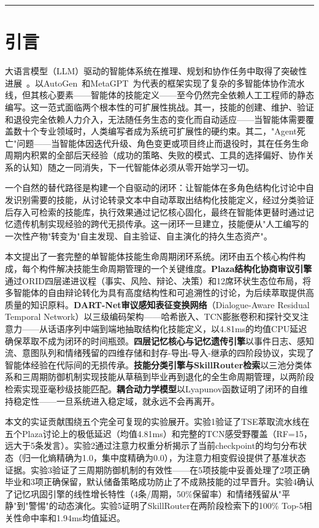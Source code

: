 \documentclass[12pt,a4paper]{ctexart}
\begin{document}
\vspace{12pt}
\hrule
\vspace{12pt}

\section{引言}

大语言模型（LLM）驱动的智能体系统在推理、规划和协作任务中取得了突破性进展~\cite{wu2023autogen,park2023generative,hong2023metagpt,shinn2023reflexion,yao2022react}。以AutoGen~\cite{wu2023autogen}和MetaGPT~\cite{hong2023metagpt}为代表的框架实现了复杂的多智能体协作流水线，但其核心要素——智能体的技能定义——至今仍然完全依赖人工工程师的静态编写。这一范式面临两个根本性的可扩展性挑战。其一，技能的创建、维护、验证和退役完全依赖人力介入，无法随任务生态的变化而自动适应——当智能体需要覆盖数十个专业领域时，人类编写者成为系统可扩展性的硬约束。其二，"Agent死亡"问题——当智能体因迭代升级、角色变更或项目终止而退役时，其在任务生命周期内积累的全部后天经验（成功的策略、失败的模式、工具的选择偏好、协作关系的认知）随之一同消失，下一代智能体必须从零开始学习一切。

一个自然的替代路径是构建一个自驱动的闭环：让智能体在多角色结构化讨论中自发识别需要的技能，从讨论转录文本中自动萃取出结构化技能定义，经过分类验证后存入可检索的技能库，执行效果通过记忆核心固化，最终在智能体更替时通过记忆遗传机制实现经验的跨代无损传承。这一闭环一旦建立，技能便从"人工编写的一次性产物"转变为"自主发现、自主验证、自主演化的持久生态资产"。

本文提出了一套完整的单智能体技能生命周期闭环系统。闭环由五个核心构件构成，每个构件解决技能生命周期管理的一个关键维度。\textbf{Plaza结构化协商审议引擎}通过ORID四层递进议程（事实、风险、辩论、决策）和12席环状生态位布局，将多智能体的自由辩论转化为具有高度结构性和可追溯性的讨论，为后续萃取提供高质量的知识原料。\textbf{DART-Net审议感知表征变换网络}（Dialogue-Aware Residual Temporal Network）以三级编码架构——哈希嵌入、TCN膨胀卷积和探针交叉注意力——从话语序列中端到端地抽取结构化技能定义，以4.81ms的均值CPU延迟确保萃取不成为闭环的时间瓶颈。\textbf{四层记忆核心与记忆遗传引擎}以事件日志、感知流、意图队列和情绪残留的四维存储和封存-导出-导入-继承的四阶段协议，实现了智能体经验在代际间的无损传承。\textbf{技能分类引擎与SkillRouter检索}以三池分类体系和三周期防御机制实现技能从草稿到毕业再到退化的全生命周期管理，以两阶段检索实现亚毫秒级技能匹配。\textbf{耦合动力学模型}以Lyapunov函数证明了闭环的自维持稳定性——一旦系统进入稳定域，就永远不会再离开。

本文的实证贡献围绕五个完全可复现的实验展开。实验1验证了TSE萃取流水线在五个Plaza讨论上的极低延迟（均值4.81ms）和完整的TCN感受野覆盖（RF=15，远大于5条发言）。实验2通过注意力权重分析揭示了当前checkpoint的均匀分布状态（归一化熵精确为1.0，集中度精确为0.0），为注意力相变假设提供了基准状态证据。实验3验证了三周期防御机制的有效性——在5项技能中妥善处理了2项正确毕业和3项正确保留，默认储备策略成功防止了不成熟技能的过早晋升。实验4确认了记忆巩固引擎的线性增长特性（4条/周期，50\%保留率）和情绪残留从"平静"到"警惕"的动态演化。实验5证明了SkillRouter在两阶段检索下的100\% Top-5相关性命中率和1.94ms均值延迟。
\end{document}
